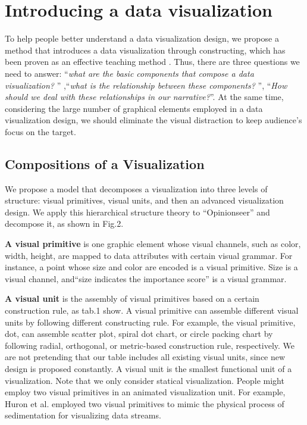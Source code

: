 \section{Introducing a data visualization} \label{analysis}
To help people better understand a data visualization design, we propose a method that introduces a data visualization through constructing, which has been proven as an effective teaching method\cite{huron_constructive_2014, chapman_constructive_1988} . Thus, there are three questions we need to answer: ``\textit{what are the basic components that compose a data visualization? }'' ,``\textit{what is the relationship between these components? }'', ``\textit{How should we deal with these relationships in our narrative?}''. At the same time, considering the large number of graphical elements employed in a data visualization design, we should eliminate the visual distraction to keep audience's focus on the target.

\subsection{Compositions of a Visualization}\label{compositions}
We propose a model that decomposes a visualization into three levels of structure: visual primitives, visual units, and then an advanced visualization design. 
We apply this hierarchical structure theory to ``Opinionseer''\cite{wu_opinionseer:_2010} and decompose it, as shown in Fig.2. 

\noindent
\textbf{A visual primitive} is one graphic element whose visual channels, such as color, width, height, are mapped to data attributes with certain visual grammar.  For instance, a point whose size and color are encoded is a visual primitive. Size is a visual channel, and``size indicates the importance score'' is a visual grammar. 

\noindent
\textbf{A visual unit} is the assembly of visual primitives based on a certain construction rule, as tab.1 show. 
A visual primitive can assemble different visual units by following different constructing rule. For example, the visual primitive, dot, can assemble scatter plot, spiral dot chart, or circle packing chart by following radial, orthogonal, or metric-based construction rule, respectively. We are not pretending that our table includes all existing visual units, since new design is proposed constantly. A visual unit is the smallest functional unit of a visualization. Note that we only consider statical visualization. People might employ two visual primitives in an animated visualization unit. For example, Huron et al.\cite{huron_visual_2013} employed two visual primitives to mimic the physical process of sedimentation for visualizing data streams. 

